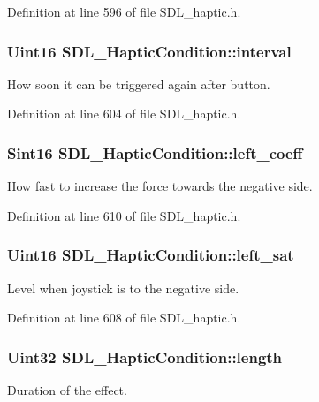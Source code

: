 Definition at line 596 of file S\+D\+L\+\_\+haptic.\+h.

\hypertarget{structSDL__HapticCondition_aafc182abea1078bed7e9cf5d0e713ea2}{
\subsubsection[{interval}]{\setlength{\rightskip}{0pt plus 5cm}Uint16 S\+D\+L\+\_\+\+Haptic\+Condition\+::interval}}\label{structSDL__HapticCondition_aafc182abea1078bed7e9cf5d0e713ea2}
How soon it can be triggered again after button. 

Definition at line 604 of file S\+D\+L\+\_\+haptic.\+h.

\hypertarget{structSDL__HapticCondition_ad0cb577a8aaf26d4cfcd857b7a6c44db}{
\subsubsection[{left\+\_\+coeff}]{\setlength{\rightskip}{0pt plus 5cm}Sint16 S\+D\+L\+\_\+\+Haptic\+Condition\+::left\+\_\+coeff}}\label{structSDL__HapticCondition_ad0cb577a8aaf26d4cfcd857b7a6c44db}
How fast to increase the force towards the negative side. 

Definition at line 610 of file S\+D\+L\+\_\+haptic.\+h.

\hypertarget{structSDL__HapticCondition_a9b7f297ab398efd2a9b9cb68eaab0834}{
\subsubsection[{left\+\_\+sat}]{\setlength{\rightskip}{0pt plus 5cm}Uint16 S\+D\+L\+\_\+\+Haptic\+Condition\+::left\+\_\+sat}}\label{structSDL__HapticCondition_a9b7f297ab398efd2a9b9cb68eaab0834}
Level when joystick is to the negative side. 

Definition at line 608 of file S\+D\+L\+\_\+haptic.\+h.

\hypertarget{structSDL__HapticCondition_ad0efb0a6ddc20f058e87199eaaa95978}{
\subsubsection[{length}]{\setlength{\rightskip}{0pt plus 5cm}Uint32 S\+D\+L\+\_\+\+Haptic\+Condition\+::length}}\label{structSDL__HapticCondition_ad0efb0a6ddc20f058e87199eaaa95978}
Duration of the effect. 

